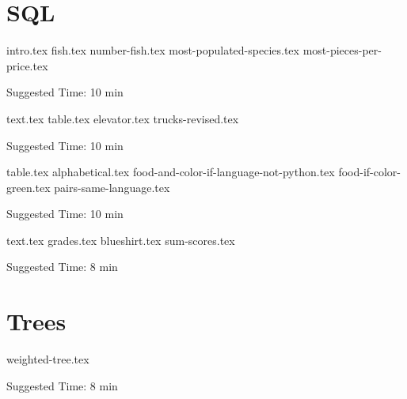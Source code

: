 \documentclass{exam}
\begin{document}
\section{SQL}
\begin{questions}



    {intro.tex}
    {fish.tex}
    {number-fish.tex}
    {most-populated-species.tex}
    {most-pieces-per-price.tex}
    \begin{questionmeta}
        Suggested Time: 10 min
    \end{questionmeta}

    \newpage


    {text.tex}
    {table.tex}
    {elevator.tex}
    {trucks-revised.tex}
    \begin{questionmeta}
        Suggested Time: 10 min
    \end{questionmeta}

    \newpage

    {table.tex}
    {alphabetical.tex}
    {food-and-color-if-language-not-python.tex}
    {food-if-color-green.tex}
    {pairs-same-language.tex}
    \begin{questionmeta}
        Suggested Time: 10 min
    \end{questionmeta}

    \newpage


    {text.tex}
    {grades.tex}
    {blueshirt.tex}
    {sum-scores.tex}
    \begin{questionmeta}
        Suggested Time: 8 min
    \end{questionmeta}

\end{questions}


\section{Trees}
\begin{questions}
    {weighted-tree.tex}
    \begin{questionmeta}
        Suggested Time: 8 min
    \end{questionmeta}

\end{questions}
\end{document}
